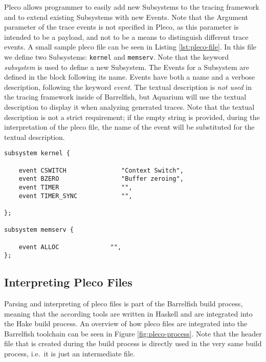 \documentclass[a4paper,11pt,twoside]{report}
\begin{document}
Pleco allows programmer to easily add new Subsystems to the tracing framework
and to extend existing Subsystems with new Events. Note that the Argument
parameter of the trace events is not specified in Pleco, as this parameter is
intended to be a payload, and not to be a means to distinguish different trace
events. A small sample pleco file can be seen in Listing
\ref{lst:pleco-file}. In this file we define two Subsystems: \texttt{kernel} and
\texttt{memserv}. Note that the keyword \emph{subsystem} is used to define a new
Subsystem. The Events for a Subsystem are defined in the block following its
name. Events have both a name and a verbose description, following the keyword
\emph{event}. The textual description is \emph{not used} in the tracing framework
inside of Barrelfish, but Aquarium will use the textual description to display
it when analyzing generated traces. Note that the textual description is not a
strict requirement; if the empty string is provided, during the interpretation
of the pleco file, the name of the event will be substituted for the textual
description.

\begin{code}
\begin{lstlisting}[frame=single, caption={A small example pleco file with two
	Subsystems.}, label={lst:pleco-file}]
subsystem kernel {

	event CSWITCH               "Context Switch",
	event BZERO                 "Buffer zeroing",
	event TIMER                 "",
	event TIMER_SYNC            "",

};

subsystem memserv {

	event ALLOC	             "",
};
\end{lstlisting}
\end{code}

\subsection{Interpreting Pleco Files}

Parsing and interpreting of pleco files is part of the Barrelfish build process,
meaning that the according tools are written in Haskell and are integrated into
the Hake build process.  An overview of how pleco files are integrated into the
Barrelfish toolchain can be seen in Figure \ref{fig:pleco-process}. Note that
the header file that is created during the build process is directly used in the
very same build process, i.e.~it is just an intermediate file.
\end{document}

